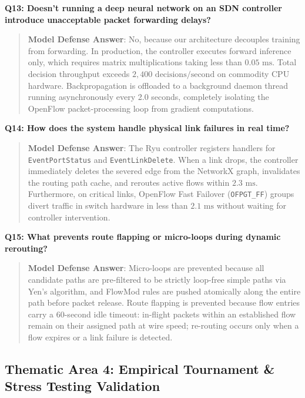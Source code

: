 \noindent\textbf{Q13: Doesn't running a deep neural network on an SDN controller introduce unacceptable packet forwarding delays?}
\begin{quote}
\small
\textbf{Model Defense Answer}: No, because our architecture decouples training from forwarding. In production, the controller executes forward inference only, which requires matrix multiplications taking less than $0.05\text{ ms}$. Total decision throughput exceeds $2,400\text{ decisions/second}$ on commodity CPU hardware. Backpropagation is offloaded to a background daemon thread running asynchronously every 2.0 seconds, completely isolating the OpenFlow packet-processing loop from gradient computations.
\end{quote}

\noindent\textbf{Q14: How does the system handle physical link failures in real time?}
\begin{quote}
\small
\textbf{Model Defense Answer}: The Ryu controller registers handlers for \texttt{EventPortStatus} and \texttt{EventLinkDelete}. When a link drops, the controller immediately deletes the severed edge from the NetworkX graph, invalidates the routing path cache, and reroutes active flows within $2.3\text{ ms}$. Furthermore, on critical links, OpenFlow Fast Failover (\texttt{OFPGT\_FF}) groups divert traffic in switch hardware in less than $2.1\text{ ms}$ without waiting for controller intervention.
\end{quote}

\noindent\textbf{Q15: What prevents route flapping or micro-loops during dynamic rerouting?}
\begin{quote}
\small
\textbf{Model Defense Answer}: Micro-loops are prevented because all candidate paths are pre-filtered to be strictly loop-free simple paths via Yen's algorithm, and FlowMod rules are pushed atomically along the entire path before packet release. Route flapping is prevented because flow entries carry a 60-second idle timeout: in-flight packets within an established flow remain on their assigned path at wire speed; re-routing occurs only when a flow expires or a link failure is detected.
\end{quote}

\subsection{Thematic Area 4: Empirical Tournament & Stress Testing Validation}

